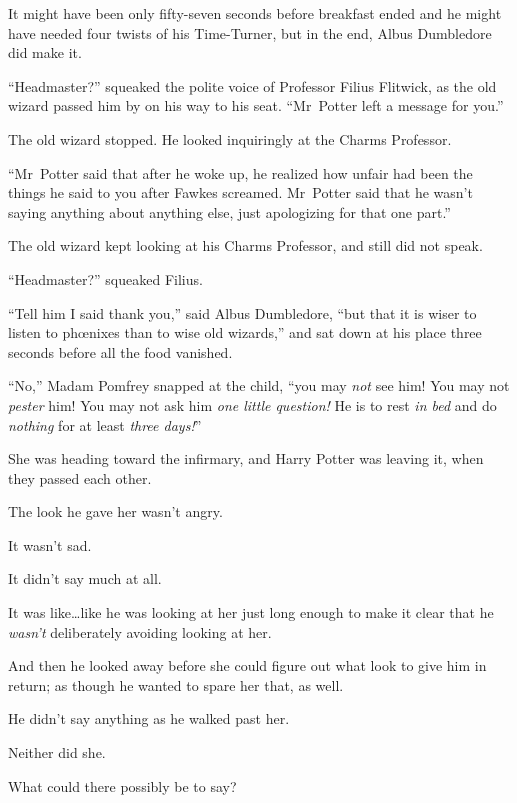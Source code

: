 
It might have been only fifty-seven seconds before breakfast ended and he might have needed four twists of his Time-Turner, but in the end, Albus Dumbledore did make it.

“Headmaster?” squeaked the polite voice of Professor Filius Flitwick, as the old wizard passed him by on his way to his seat. “Mr~Potter left a message for you.”

The old wizard stopped. He looked inquiringly at the Charms Professor.

“Mr~Potter said that after he woke up, he realized how unfair had been the things he said to you after Fawkes screamed. Mr~Potter said that he wasn’t saying anything about anything else, just apologizing for that one part.”

The old wizard kept looking at his Charms Professor, and still did not speak.

“Headmaster?” squeaked Filius.

“Tell him I said thank you,” said Albus Dumbledore, “but that it is wiser to listen to phœnixes than to wise old wizards,” and sat down at his place three seconds before all the food vanished.


“No,” Madam Pomfrey snapped at the child, “you may \emph{not} see him! You may not \emph{pester} him! You may not ask him \emph{one little question!} He is to rest \emph{in bed} and do \emph{nothing} for at least \emph{three days!}”


She was heading toward the infirmary, and Harry Potter was leaving it, when they passed each other.

The look he gave her wasn’t angry.

It wasn’t sad.

It didn’t say much at all.

It was like…like he was looking at her just long enough to make it clear that he \emph{wasn’t} deliberately avoiding looking at her.

And then he looked away before she could figure out what look to give him in return; as though he wanted to spare her that, as well.

He didn’t say anything as he walked past her.

Neither did she.

What could there possibly be to say?

